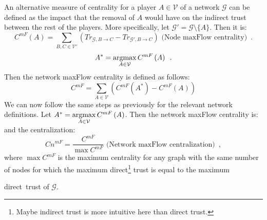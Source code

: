     An alternative measure of centrality for a player $A \in \mathcal{V}$ of a network $\mathcal{G}$ can be defined as the
    impact that the removal of $A$ would have on the indirect trust between the rest of the players. More specifically, let
    $\mathcal{G}' = \mathcal{G} \setminus \{A\}$. Then it is:
    \begin{equation*}
      C^{mF}\left(A\right) = \sum\limits_{B,C \in \mathcal{V}'}\left(Tr_{\mathcal{G}, B \rightarrow C} - Tr_{\mathcal{G}', B
      \rightarrow C}\right) \mbox{ (Node maxFlow centrality)} \enspace.
    \end{equation*}
    \begin{equation*}
      A^* = \operatorname*{argmax}\limits_{A \in \mathcal{V}}C^{mF}\left(A\right) \enspace.
    \end{equation*}
    Then the network maxFlow centrality is defined as follows:
    \begin{equation*}
      C^{mF} = \sum\limits_{A \in \mathcal{V}}\left(C^{mF}\left(A^*\right) - C^{mF}\left(A\right)\right)
    \end{equation*}
    We can now follow the same steps as previously for the relevant network definitions. Let $A^* = \operatorname*{argmax}\limits_{A \in
    \mathcal{V}}C^{mF}\left(A\right)$. Then the network maxFlow centrality is:
    and the centralization:
    \begin{equation*}
      Cn^{mF} = \frac{C^{mF}}{\max C^{mF}} \mbox{ (Network maxFlow centralization)} \enspace,
    \end{equation*}
    where $\max C^{mF}$ is the maximum centrality for any graph with the same number of nodes for which the maximum
    direct\footnote{Maybe indirect trust is more intuitive here than direct trust.} trust is equal to the maximum
    \addtocounter{footnote}{-1} direct\footnotemark \ trust of $\mathcal{G}$.

    \noindent\hrulefill
    \newpage
